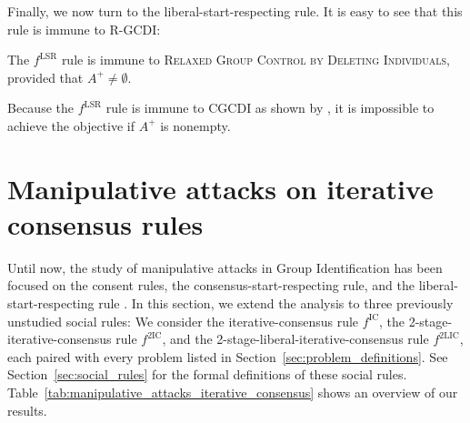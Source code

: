 \documentclass[
    12pt,               %
    a4paper,            %
    bibtotoc,           %
    pointlessnumbers,   %
    ngerman,            %
    titlepage,          %
    leqno,              %
    ]{scrarticle}       %
\newcommand\secref{Section~\ref}
\newcommand\tableref{Table~\ref}
\begin{document}
Finally, we now turn to the liberal-start-respecting rule. It is easy to see that this rule is immune to R-GCDI:

\begin{Observation} \label{obs:lsr_rgcdi_i}
The $f^{\text{LSR}}$ rule is immune to \textsc{Relaxed Group Control by Deleting Individuals}, provided that $A^+ \neq \emptyset$.
\end{Observation}

\begin{Proof}
Because the $f^{\text{LSR}}$ rule is immune to CGCDI as shown by \textcite[Theorem 7]{YD18}, it is impossible to achieve the objective if $A^+$ is nonempty.
\end{Proof}










\clearpage

\section{Manipulative attacks on iterative consensus rules}
\label{sec:manipulative_attacks_iterative_consensus}

Until now, the study of manipulative attacks in Group Identification has been focused on the consent rules, the consensus-start-respecting rule, and the liberal-start-respecting rule \cite{YD18,ERY20,BBKL20,J22}. In this section, we extend the analysis to three previously unstudied social rules: We consider the iterative-consensus rule $f^{\text{IC}}$, the 2-stage-iterative-consensus rule $f^{\text{2IC}}$, and the 2-stage-liberal-iterative-consensus rule $f^{\text{2LIC}}$, each paired with every problem listed in \secref{sec:problem_definitions}. See \secref{sec:social_rules} for the formal definitions of these social rules. \tableref{tab:manipulative_attacks_iterative_consensus} shows an overview of our results.



\renewcommand{\arraystretch}{1.8}
\end{document}
